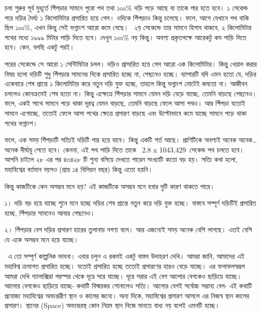 \documentclass[
]{book}
\begin{document}
চলা শুরুর পূর্ব মুহূর্তে পিঁপড়ার সামনে পুরো পথ তথা ১০০\% দড়ি পড়ে আছে যা তাকে পার হতে হবে। ১ সেকেন্ড পরে দড়ির দৈর্ঘ্য ১ কিলোমিটার প্রসারিত হয়ে গেল। ওদিকে পিঁপড়াও কিন্তু চলেছে। ফলে, আগে যেখানে পথ বাকি ছিল ১০০\%, এখন কিন্তু সেই ভগ্নাংশ আরো কমে গেছে।~ ২য় সেকেন্ডে তার সামনে হিসাব থাকবে, ২ কিলোমিটার পথের মধ্যে ১৯৯৯ মিটার পাড়ি দিতে হবে। দেখুন ১০০\% নয় কিন্তু। অবশ্য প্রকৃতপক্ষে আরেকটু কম পাড়ি দিতে হবে। কেন, বলছি একটু পরই।

পরের সেকেন্ডে সে আরো ১ সেন্টিমিটার চলল। দড়িও প্রাসারিত হয়ে গেল আরো এক কিলোমিটার। কিন্তু খেয়াল করার বিষয় হলো দড়িটি শুধু পিঁপড়ার সামনের দিকে প্রসারিত হচ্ছে না, পেছনেও হচ্ছে। ব্যাপারটি যদি এমন হতো যে, দড়ির একেবারে শেষ প্রান্তে ১ কিলোমিটার করে নতুন দড়ি যুক্ত হচ্ছে, তাহলে কিন্তু ভগ্নাংশ মোটেই কমতো না। আজীবন চললেও কোনক্রমেই শেষ হতো না।
কিন্তু এক্ষেত্রে পিঁপড়ার সামনে যেমন দড়ি বেড়ে যাচ্ছে, তেমনি বাড়ছে পেছনেও। ফলে, একই সাথে সামনে পড়ে থাকা দূরত্ব যেমন বাড়ছে, তেমনি বাড়ছে ফেলে আসা পথও। আর পিঁপড়া যতোই সামনে এগোচ্ছে, ততোই ফেলে আসা পথের ক্ষেত্রে প্রসারণ বাড়ছে এবং উল্টোভাবে কমে যাচ্ছে সামনে পড়ে থাকা পথের ভগ্নাংশ।

ফলে, এক সময় পিঁপড়াটি সত্যিই দড়িটি পার হয়ে যাবে। কিন্তু একটি শর্ত আছে। প্রাণিটিকে অবশ্যই অনেক অনেক\ldots{} অনেক দীর্ঘায়ু পেতে হবে। কেননা, এই পথ পাড়ি দিতে তাকে~ 2.8 x 1043,429~সেকেন্ড পথ চলতে হবে।
আপনি চাইলে ২৮ এর পর ৪৩৪২৮ টি শুন্য বসিয়ে দেখতে পারেন সংখ্যাটি কতো বড় হয়। সত্যি কথা হলো, মহাবিশ্বের বর্তমান বয়সও (প্রায় ১৪ বিলিয়ন বছর) কিন্তু এতো হয়নি।~

কিন্তু কাজটিকে কেন অসম্ভব মনে হয়?
এই কাজটিকে অসম্ভব মনে হবার দুটি কারণ থাকতে পারে।

১। দড়ি বড় হয়ে যাচ্ছে শুনে মনে হচ্ছে দড়ির শেষ প্রান্তে নতুন করে দড়ি যুক্ত হচ্ছে। বাস্তবে সম্পূর্ণ দড়িটিই প্রসারিত হচ্ছে, পিঁপড়ার সামনেও আবার পেছনেও।

২। পিঁপড়ার বেগ দড়ির প্রসারণ হারের তুলানায় নগণ্য বলে। আর এজন্যেই সময় অনেক বেশি লাগছে। এতই বেশি যে একে অসম্ভব মনে হয়ে যাচ্ছে।

~এ তো সম্পূর্ণ কাল্পনিক ভাবনা। এবার চলুন এ রকমই একটু বাস্তব উদাহরণ দেখি। আমরা জানি, আমাদের এই মহাবিশ্ব ক্রমাগত প্রসারিত হচ্ছে। যতোই প্রসারিত হচ্ছে ততোই প্রসারণের হারও বেড়ে যাচ্ছে। এর ফলাফলস্বরূপ আমরা দেখি গ্যালাক্সিরা পরস্পর থেকে দূরে সরে যাচ্ছে। দূরে সরার এই বেগ আলোর বেগকেও ছাড়িয়ে যাচ্ছে।
~
আলোর বেগকেও ছাড়িয়ে যাচ্ছে- কথাটি বিস্ময়কর শোনালেও সত্যি। আলোর বেগই সর্বোচ্চ সম্ভাব্য বেগ- এই কথাটি প্রযোজ্য মহাবিশ্বের অভ্যন্তরীণ স্থান ও কালের জন্যে। অন্য দিকে, মহাবিশ্বের প্রসারণ আসলে এর নিজস্ব স্থান কালের প্রসারণ। স্থানের (Space) অভ্যন্তরস্থ কোন নিয়ম স্থান নিজে মানতে বাধ্য নয় বলেই এমনটি হচ্ছে।
\end{document}
